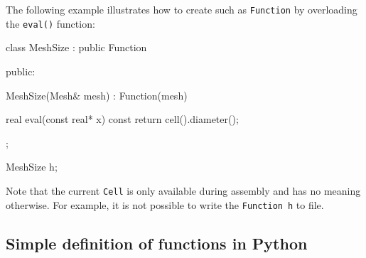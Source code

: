 The following example illustrates how to create such as
\texttt{Function} by overloading the \texttt{eval()} function:
\begin{code}
class MeshSize : public Function
{
public:

  MeshSize(Mesh& mesh) : Function(mesh) {}

  real eval(const real* x) const
  {
    return cell().diameter();
  }
    
};

MeshSize h;
\end{code}

Note that the current \texttt{Cell} is only available during assembly
and has no meaning otherwise. For example, it is not possible to write the
\texttt{Function}~\texttt{h} to file.


\subsection{Simple definition of functions in Python}


